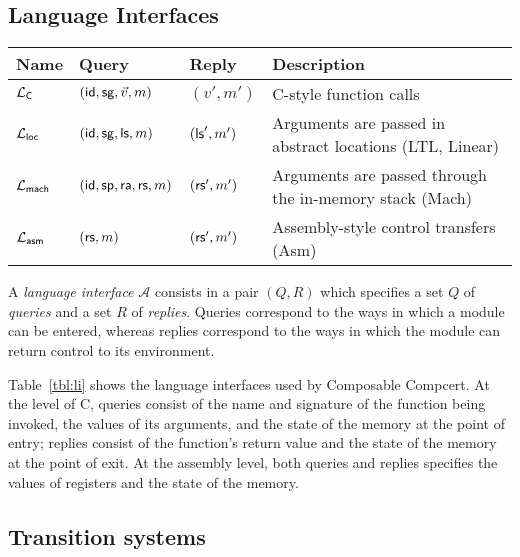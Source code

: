 \subsection{Language Interfaces} %

\begin{table*} %
  \begin{tabular}{llll}
    \hline
    Name & Query & Reply & Description \\
    \hline
    $\mathcal{L}_{ \textsf{C} }$ & $( \textsf{id} ,  \textsf{sg} , \vec{v}, m)$ & $(v', m')$ &
      C-style function calls \\
    $\mathcal{L}_{ \textsf{loc} }$ & $( \textsf{id} ,  \textsf{sg} ,  \textsf{ls} , m)$ & $( \textsf{ls} ', m')$ &
      Arguments are passed in abstract locations (LTL, Linear) \\
    $\mathcal{L}_{ \textsf{mach} }$ & $( \textsf{id} ,  \textsf{sp} , \textsf{ra} , \textsf{rs} , m)$ & $( \textsf{rs} ', m')$ &
      Arguments are passed through the in-memory stack (Mach) \\
    $\mathcal{L}_{ \textsf{asm} }$ & $( \textsf{rs} , m)$ & $( \textsf{rs} ', m')$ &
      Assembly-style control transfers (Asm) \\
    \hline
  \end{tabular}
  \caption{Language interfaces for the various Compcert intermediate languages.}
  \label{tbl:li}
\end{table*}

\begin{definition}
A \emph{language interface} $\mathcal{A}$ consists in a pair $(Q, R)$
which specifies
a set $Q$ of \emph{queries} and
a set $R$ of \emph{replies}.
Queries
correspond to the ways in which
a module can be entered, whereas
replies
correspond to the ways in which
the module can return control
to its environment.
\end{definition}

Table~\ref{tbl:li}
shows the language interfaces used by Composable Compcert.
At the level of C,
queries consist of
the name and signature of the function being invoked,
the values of its arguments,
and the state of the memory at the point of entry;
replies
consist of the function's return value
and the state of the memory at the point of exit.
At the assembly level,
both queries and replies specifies
the values of registers and the state of the memory.


\subsection{Transition systems} %

